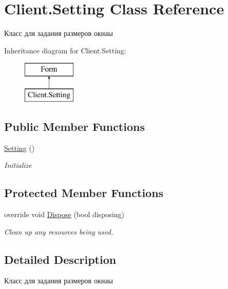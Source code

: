 \hypertarget{class_client_1_1_setting}{}\section{Client.\+Setting Class Reference}
\label{class_client_1_1_setting}


Класс для задания размеров окнаы  


Inheritance diagram for Client.\+Setting\+:\begin{figure}[H]
\begin{center}
\leavevmode
\includegraphics[height=2.000000cm]{class_client_1_1_setting}
\end{center}
\end{figure}
\subsection*{Public Member Functions}
\begin{DoxyCompactItemize}
\item 
\hyperlink{class_client_1_1_setting_a733582576c54cf20fd2437cd1240a97c}{Setting} ()
\begin{DoxyCompactList}\small\item\em Initialize \end{DoxyCompactList}\end{DoxyCompactItemize}
\subsection*{Protected Member Functions}
\begin{DoxyCompactItemize}
\item 
override void \hyperlink{class_client_1_1_setting_abcc5beb1a34b3f8076237e7d4bca5b29}{Dispose} (bool disposing)
\begin{DoxyCompactList}\small\item\em Clean up any resources being used. \end{DoxyCompactList}\end{DoxyCompactItemize}


\subsection{Detailed Description}
Класс для задания размеров окнаы 



